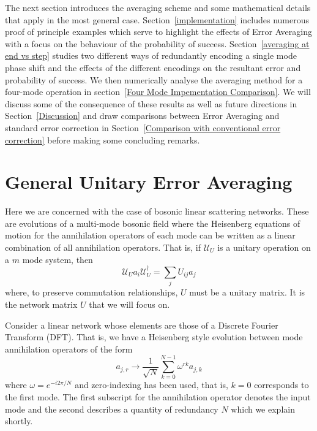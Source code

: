 \documentclass[aps,pra,twocolumn,superscriptaddress,numerical,floatfix]{revtex4-1}
\begin{document}
The next section introduces the averaging scheme and some mathematical details that apply in the most general case. Section~\ref{implementation} includes numerous proof of principle examples which serve to highlight the effects of Error Averaging with a focus on the behaviour of the probability of success. Section~\ref{averaging at end vs step} studies two different ways of redundantly encoding a single mode phase shift and the effects of the different encodings on the resultant error and probability of success.  We then numerically analyse the averaging method for a four-mode operation in section~\ref{Four Mode Impementation Comparison}.  We will discuss some of the consequence of these results as well as future directions in Section~\ref{Discussion} and draw comparisons between Error Averaging and standard error correction in Section~\ref{Comparison with conventional error correction} before making some concluding remarks. 

\section{General Unitary Error Averaging\label{gen case}}

Here we are concerned with the case of bosonic linear scattering networks.  These are evolutions of a multi-mode bosonic field where the Heisenberg equations of motion for the annihilation operators of each mode can be written as a linear combination of all annihilation operators.  That is, if $\mathcal{U}_U$ is a unitary operation on a $m$ mode system, then
\begin{equation}
	\mathcal{U}_U a_i \mathcal{U}_U^\dagger = \sum_j U_{ij} a_j
\end{equation}
where, to preserve commutation relationships, $U$ must be a unitary matrix.  It is the network matrix $U$ that we will focus on.

Consider a linear network whose elements are those of a Discrete Fourier Transform (DFT).  That is, we have a Heisenberg style evolution between mode annihilation operators of the form
\begin{equation}
	a_{j,r} \rightarrow \frac{1}{\sqrt{N}} \sum_{k=0}^{N-1} \omega^{rk} a_{j,k}	
\end{equation}
where $\omega = e^{-i2\pi /N}$ and zero-indexing has been used, that is, $k=0$ corresponds to the first mode. The first subscript for the annihilation operator denotes the input mode and the second describes a quantity of redundancy $N$ which we explain shortly. 
\end{document}
